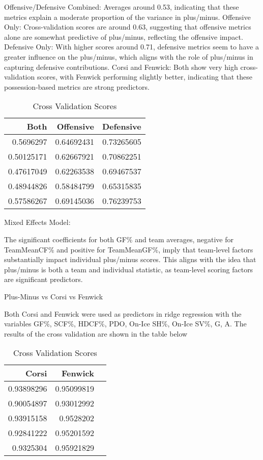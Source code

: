\documentclass[12pt]{article}
\begin{document}
Offensive/Defensive Combined: Averages around 0.53, indicating that these metrics explain a moderate proportion of the variance in plus/minus.
Offensive Only: Cross-validation scores are around 0.63, suggesting that offensive metrics alone are somewhat predictive of plus/minus, 
reflecting the offensive impact.
Defensive Only: With higher scores around 0.71, defensive metrics seem to have a greater influence on the plus/minus, which aligns with 
the role of plus/minus in capturing defensive contributions.
Corsi and Fenwick: Both show very high cross-validation scores, with Fenwick performing slightly better, indicating that these 
possession-based metrics are strong predictors.

\begin{table}[tbp]
  \caption{Cross Validation Scores}
  \label{tab:rv}
\centering
\begin{tabular}{rrr}
  \toprule
Both & Offensive & Defensive \\ 
  \midrule
  0.5696297 & 0.64692431 & 0.73265605 \\ 
  0.50125171 & 0.62667921 & 0.70862251 \\ 
  0.47617049 & 0.62263538 & 0.69467537 \\ 
  0.48944826 & 0.58484799 & 0.65315835 \\ 
  0.57586267 & 0.69145036 & 0.76239753 \\ 
  \bottomrule
\end{tabular}
\end{table}

Mixed Effects Model:


The significant coefficients for both GF\% and team averages, negative for TeamMeanCF\% and positive for TeamMeanGF\%, imply that 
team-level factors substantially impact individual plus/minus scores.
This aligns with the idea that plus/minus is both a team and individual statistic, as team-level scoring factors are significant predictors.

Plus-Minus vs Corsi vs Fenwick

Both Corsi and Fenwick were used as predictors in ridge regression with the variables GF\%, SCF\%, HDCF\%, PDO, On-Ice SH\%, On-Ice SV\%, G, A.
The results of the cross validation are shown in the table below

\begin{table}[tbp]
  \caption{Cross Validation Scores}
  \label{tab:rv}
\centering
\begin{tabular}{rrr}
  \toprule
Corsi & Fenwick \\ 
  \midrule
  0.93898296 & 0.95099819 \\ 
  0.90054897 & 0.93012992 \\ 
  0.93915158 & 0.9528202 \\ 
  0.92841222 & 0.95201592 \\ 
  0.9325304 & 0.95921829 \\ 
   \bottomrule
\end{tabular}
\end{table}
\end{document}
